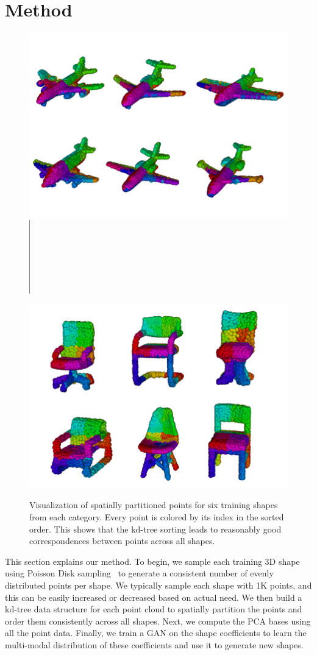 \section{Method}\label{sec:method}

\begin{figure}
\centering
\includegraphics[width=0.49\linewidth]{PCAGAN/images/airplanes_sorting_new2.png}
\includegraphics[height=1.4in]{PCAGAN/images/vline.png}
\includegraphics[width=0.49\linewidth]{PCAGAN/images/chairs_sorting.png}
\vspace{-12pt}
\caption{\small \label{fig:point_sorting} Visualization of spatially partitioned points for six training shapes from each category. Every point is colored by its index in the sorted order. This shows that the kd-tree sorting leads to reasonably good correspondences between points across all shapes.}
\vspace{-12pt} 
\end{figure}

This section explains our method. To begin, we sample each training 3D shape using Poisson Disk sampling~\cite{Bowers:2010:PPD} to generate a consistent number of evenly distributed points per shape. We typically sample each shape with 1K points, and this can be easily increased or decreased based on actual need. We then build a kd-tree data structure for each point cloud to spatially partition the points and order them consistently across all shapes. Next, we compute the PCA bases using all the point data. 
Finally, we train a GAN on the shape coefficients to learn the multi-modal distribution of these coefficients and use it to generate new shapes.

